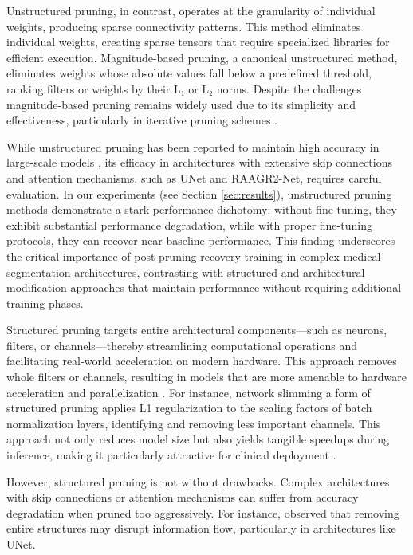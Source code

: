 \documentclass[12pt,a4paper]{article}
\begin{document}
Unstructured pruning, in contrast, operates at the granularity of individual weights, producing sparse connectivity patterns. This method eliminates individual weights, creating sparse tensors that require specialized libraries for efficient execution. Magnitude-based pruning, a canonical unstructured method, eliminates weights whose absolute values fall below a predefined threshold, ranking filters or weights by their L₁ or L₂ norms. Despite the challenges magnitude-based pruning remains widely used due to its simplicity and effectiveness, particularly in iterative pruning schemes \cite{Liu2023Survey, Wu2023}.

While unstructured pruning has been reported to maintain high accuracy in large-scale models \cite{Gale2020Sparse}, its efficacy in architectures with extensive skip connections and attention mechanisms, such as UNet and RAAGR2-Net, requires careful evaluation. In our experiments (see Section \ref{sec:results}), unstructured pruning methods demonstrate a stark performance dichotomy: without fine-tuning, they exhibit substantial performance degradation, while with proper fine-tuning protocols, they can recover near-baseline performance. This finding underscores the critical importance of post-pruning recovery training in complex medical segmentation architectures, contrasting with structured and architectural modification approaches that maintain performance without requiring additional training phases.

Structured pruning targets entire architectural components—such as neurons, filters, or channels—thereby streamlining computational operations and facilitating real-world acceleration on modern hardware. This approach removes whole filters or channels, resulting in models that are more amenable to hardware acceleration and parallelization \cite{Liu2023Survey, Mazurek2024}. For instance, network slimming a form of structured pruning applies L1 regularization to the scaling factors of batch normalization layers, identifying and removing less important channels. This approach not only reduces model size but also yields tangible speedups during inference, making it particularly attractive for clinical deployment \cite{Liu2023Survey, Mazurek2024}.

However, structured pruning is not without drawbacks. Complex architectures with skip connections or attention mechanisms can suffer from accuracy degradation when pruned too aggressively. For instance, \cite{Guo2022Dependency} observed that removing entire structures may disrupt information flow, particularly in architectures like UNet.
\end{document}
